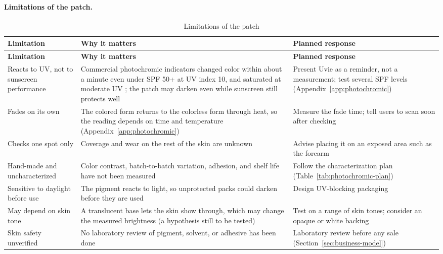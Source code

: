 \paragraph{Limitations of the patch.}
\begin{longtable}{@{}L{3.6cm}L{6.3cm}L{4.2cm}@{}}
\caption{Limitations of the patch}\label{tab:limits-patch}\\
\toprule \textbf{Limitation} & \textbf{Why it matters} & \textbf{Planned response}\\ \midrule
\endfirsthead
\toprule \textbf{Limitation} & \textbf{Why it matters} & \textbf{Planned response}\\ \midrule
\endhead
\bottomrule
\endfoot
Reacts to UV, not to sunscreen performance & Commercial photochromic indicators changed color within about a minute even under SPF 50+ at UV index 10, and saturated at moderate UV \cite{aguilera2024}; the patch may darken even while sunscreen still protects well & Present Uvie as a reminder, not a measurement; test several SPF levels (Appendix~\ref{app:photochromic})\\
\addlinespace
Fades on its own & The colored form returns to the colorless form through heat, so the reading depends on time and temperature (Appendix~\ref{app:photochromic}) & Measure the fade time; tell users to scan soon after checking\\
\addlinespace
Checks one spot only & Coverage and wear on the rest of the skin are unknown & Advise placing it on an exposed area such as the forearm\\
\addlinespace
Hand-made and uncharacterized & Color contrast, batch-to-batch variation, adhesion, and shelf life have not been measured & Follow the characterization plan (Table~\ref{tab:photochromic-plan})\\
\addlinespace
Sensitive to daylight before use & The pigment reacts to light, so unprotected packs could darken before they are used & Design UV-blocking packaging\\
\addlinespace
May depend on skin tone & A translucent base lets the skin show through, which may change the measured brightness (a hypothesis still to be tested) & Test on a range of skin tones; consider an opaque or white backing\\
\addlinespace
Skin safety unverified & No laboratory review of pigment, solvent, or adhesive has been done & Laboratory review before any sale (Section~\ref{sec:business-model})\\
\end{longtable}

